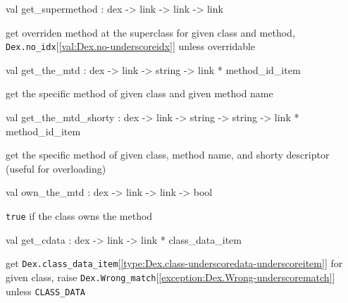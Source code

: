 \documentclass[11pt]{article}
\begin{document}
\label{val:Dex.get-underscoresupermethod}\begin{ocamldoccode}
val get_supermethod : dex -> link -> link -> link
\end{ocamldoccode}
\begin{ocamldocdescription}
get overriden method at the superclass for given class and method,
 {\tt{Dex.no\_idx}}[\ref{val:Dex.no-underscoreidx}] unless overridable


\end{ocamldocdescription}




\label{val:Dex.get-underscorethe-underscoremtd}\begin{ocamldoccode}
val get_the_mtd : dex -> link -> string -> link * method_id_item
\end{ocamldoccode}
\begin{ocamldocdescription}
get the specific method of given class and given method name


\end{ocamldocdescription}




\label{val:Dex.get-underscorethe-underscoremtd-underscoreshorty}\begin{ocamldoccode}
val get_the_mtd_shorty :
  dex -> link -> string -> string -> link * method_id_item
\end{ocamldoccode}
\begin{ocamldocdescription}
get the specific method of given class, method name,
 and shorty descriptor (useful for overloading)


\end{ocamldocdescription}




\label{val:Dex.own-underscorethe-underscoremtd}\begin{ocamldoccode}
val own_the_mtd : dex -> link -> link -> bool
\end{ocamldoccode}
\begin{ocamldocdescription}
{\tt{true}} if the class owns the method


\end{ocamldocdescription}




\label{val:Dex.get-underscorecdata}\begin{ocamldoccode}
val get_cdata : dex -> link -> link * class_data_item
\end{ocamldoccode}
\begin{ocamldocdescription}
get {\tt{Dex.class\_data\_item}}[\ref{type:Dex.class-underscoredata-underscoreitem}] for given class,
 raise {\tt{Dex.Wrong\_match}}[\ref{exception:Dex.Wrong-underscorematch}] unless {\tt{CLASS\_DATA}}


\end{ocamldocdescription}
\end{document}
